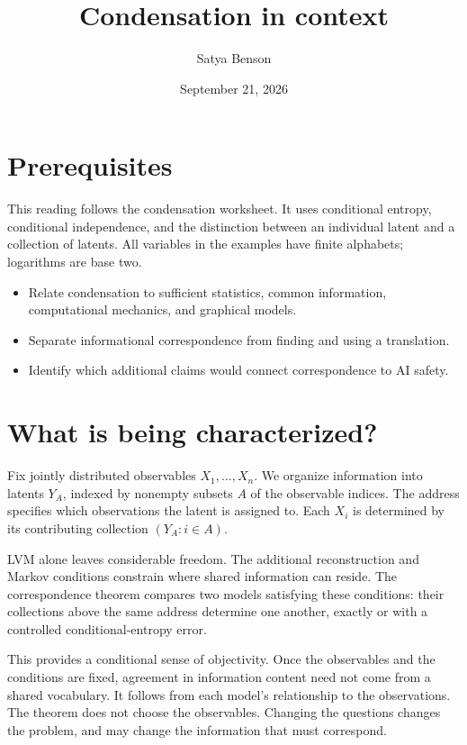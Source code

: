 \documentclass[10pt]{article}
\title{Condensation in context}
\author{Satya Benson}
\date{September 21, 2026}
\begin{document}
\maketitle

\section{Prerequisites}
This reading follows the condensation worksheet. It uses conditional entropy,
conditional independence, and the distinction between an individual latent and
a collection of latents. All variables in the examples have finite alphabets;
logarithms are base two.

\begin{learningoutcomes}
\begin{itemize}
\item Relate condensation to sufficient statistics, common information,
computational mechanics, and graphical models.
\item Separate informational correspondence from finding and using a translation.
\item Identify which additional claims would connect correspondence to AI safety.
\end{itemize}
\end{learningoutcomes}

\section{What is being characterized?}
Fix jointly distributed observables $X_1,\ldots,X_n$. We organize information
into latents $Y_A$, indexed by nonempty subsets $A$ of the observable indices.
The address specifies which observations the latent is assigned to. Each $X_i$
is determined by its contributing collection $(Y_A:i\in A)$.

LVM alone leaves considerable freedom. The additional reconstruction
and Markov conditions constrain where shared information can reside. The
correspondence theorem compares two models satisfying these conditions: their
collections above the same address determine one another, exactly or with a
controlled conditional-entropy error.

This provides a conditional sense of objectivity. Once the observables and the
conditions are fixed, agreement in information content need not come from a
shared vocabulary. It follows from each model's relationship to the observations.
The theorem does not choose the observables. Changing the questions changes the
problem, and may change the information that must correspond.
\end{document}
